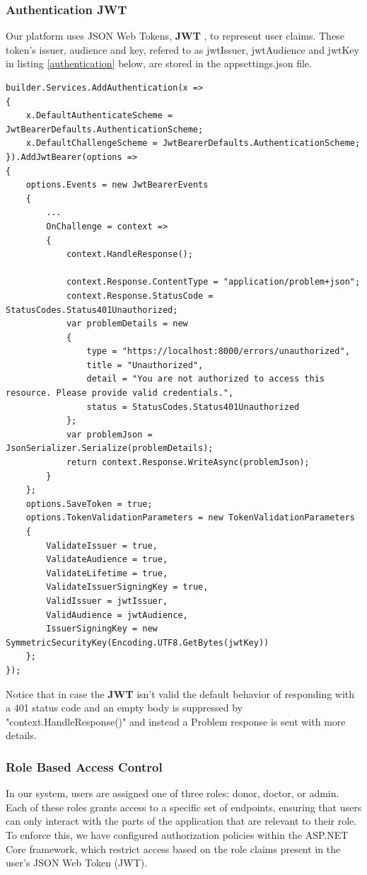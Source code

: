\subsubsection{Authentication JWT}

Our platform uses JSON Web Tokens, \textbf{JWT} \cite{rfc7519}, to represent user claims.
These token's issuer, audience and key, refered to as jwtIssuer, jwtAudience and jwtKey in listing \ref{authentication} below, are stored in the appsettings.json file.

\begin{lstlisting}[style=sharpc, caption={Custom JWT Authentication Middleware in ASP.NET Core: Handling Unauthorized Access with Detailed Problem Responses.}, label={authentication}] 
builder.Services.AddAuthentication(x =>
{
	x.DefaultAuthenticateScheme = JwtBearerDefaults.AuthenticationScheme;
	x.DefaultChallengeScheme = JwtBearerDefaults.AuthenticationScheme;
}).AddJwtBearer(options =>
{
	options.Events = new JwtBearerEvents
	{
		...
		OnChallenge = context =>
		{
			context.HandleResponse();
			
			context.Response.ContentType = "application/problem+json";
			context.Response.StatusCode = StatusCodes.Status401Unauthorized;
			var problemDetails = new
			{
				type = "https://localhost:8000/errors/unauthorized",
				title = "Unauthorized",
				detail = "You are not authorized to access this resource. Please provide valid credentials.",
				status = StatusCodes.Status401Unauthorized
			};
			var problemJson = JsonSerializer.Serialize(problemDetails);
			return context.Response.WriteAsync(problemJson);
		}
	};
	options.SaveToken = true;
	options.TokenValidationParameters = new TokenValidationParameters
	{
		ValidateIssuer = true,
		ValidateAudience = true,
		ValidateLifetime = true,
		ValidateIssuerSigningKey = true,
		ValidIssuer = jwtIssuer,
		ValidAudience = jwtAudience,
		IssuerSigningKey = new SymmetricSecurityKey(Encoding.UTF8.GetBytes(jwtKey))
	};
});
\end{lstlisting}

Notice that in case the \textbf{JWT} isn't valid the default behavior of responding with a 401 status code and an empty body is suppressed by "context.HandleResponse()" and instead a Problem response is sent with more details.

\subsubsection{Role Based Access Control}
In our system, users are assigned one of three roles: donor, doctor, or admin. Each of these roles grants access to a specific set of endpoints, ensuring that users can only interact with the parts of the application that are relevant to their role. To enforce this, we have configured authorization policies within the ASP.NET Core framework, which restrict access based on the role claims present in the user's JSON Web Token (JWT).

